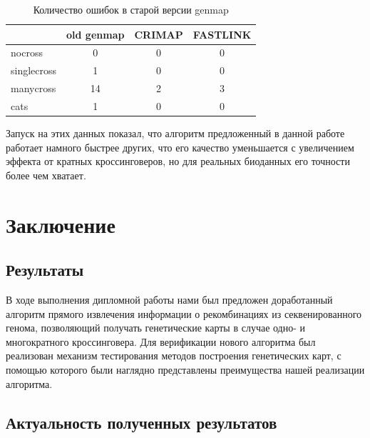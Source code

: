 \documentclass{matmex-diploma-custom}
\begin{document}

\begin{table}[h]
  \centering
  \begin{tabular}{lccc}
    \hline
    & old genmap & CRIMAP & FASTLINK \\
    \hline
    nocross & 0 & 0 & 0 \\
    singlecross & 1 & 0 & 0 \\
    manycross & 14 & 2 & 3 \\
    cats & 1 & 0 & 0 \\
    \hline
  \end{tabular}
  \caption{Количество ошибок в старой версии genmap}
  \label{tab:old}
\end{table}

Запуск на этих данных показал, что алгоритм предложенный в данной
работе работает намного быстрее других, что его качество уменьшается с
увеличением эффекта от кратных кроссинговеров, но для реальных
биоданных его точности более чем хватает.

\section*{Заключение}

\subsection*{Результаты}

В ходе выполнения дипломной работы нами был предложен доработанный
алгоритм прямого извлечения информации о рекомбинациях из
секвенированного генома, позволяющий получать генетические карты в
случае одно- и многократного кроссинговера.  Для верификации нового
алгоритма был реализован механизм тестирования методов построения
генетических карт, с помощью которого были наглядно представлены
преимущества нашей реализации алгоритма.

\subsection*{Актуальность полученных результатов}
\end{document}
